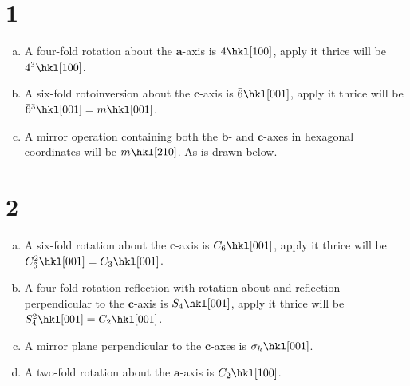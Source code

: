 \documentclass[openany]{homework}
\begin{document}
\maketitle

\section*{1}
\begin{enumerate}[a.]
    \item A four-fold rotation about the $\bm{a}$-axis is $4 \hkl[1 0 0]$, apply it thrice will be $4^3 \hkl[1 0 0]$.
    \item A six-fold rotoinversion about the $\bm{c}$-axis is $\bar{6} \hkl[0 0 1]$, apply it thrice will be $\bar{6}^3 \hkl[0 0 1] = m \hkl[0 0 1]$.
    \item A mirror operation containing both the $\bm{b}$- and $\bm{c}$-axes in hexagonal coordinates will be 
    $m \hkl[2 1 0]$. As is drawn below.
\end{enumerate}

\newpage

\section*{2}
\begin{enumerate}[a.]
    \item A six-fold rotation about the $\bm{c}$-axis is $C_6 \hkl[0 0 1]$, apply it thrice will be $C_6^2 \hkl[0 0 1] = C_3 \hkl[0 0 1]$.
    \item A four-fold rotation-reflection with rotation about and reflection perpendicular to 
    the $\bm{c}$-axis is $S_4 \hkl[0 0 1]$, apply it thrice will be $S_4^2 \hkl[0 0 1] = C_2 \hkl[0 0 1]$.
    \item A mirror plane perpendicular to the $\bm{c}$-axes is $\sigma_h \hkl[0 0 1]$.
    \item A two-fold rotation about the $\bm{a}$-axis is $C_2 \hkl[1 0 0]$.
\end{enumerate}
\end{document}
